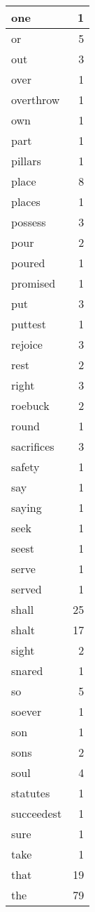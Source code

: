 \begin{center}
\begin{longtable}{l|r}
one & 1 \\ \hline
or & 5 \\ \hline
out & 3 \\ \hline
over & 1 \\ \hline
overthrow & 1 \\ \hline
own & 1 \\ \hline
part & 1 \\ \hline
pillars & 1 \\ \hline
place & 8 \\ \hline
places & 1 \\ \hline
possess & 3 \\ \hline
pour & 2 \\ \hline
poured & 1 \\ \hline
promised & 1 \\ \hline
put & 3 \\ \hline
puttest & 1 \\ \hline
rejoice & 3 \\ \hline
rest & 2 \\ \hline
right & 3 \\ \hline
roebuck & 2 \\ \hline
round & 1 \\ \hline
sacrifices & 3 \\ \hline
safety & 1 \\ \hline
say & 1 \\ \hline
saying & 1 \\ \hline
seek & 1 \\ \hline
seest & 1 \\ \hline
serve & 1 \\ \hline
served & 1 \\ \hline
shall & 25 \\ \hline
shalt & 17 \\ \hline
sight & 2 \\ \hline
snared & 1 \\ \hline
so & 5 \\ \hline
soever & 1 \\ \hline
son & 1 \\ \hline
sons & 2 \\ \hline
soul & 4 \\ \hline
statutes & 1 \\ \hline
succeedest & 1 \\ \hline
sure & 1 \\ \hline
take & 1 \\ \hline
that & 19 \\ \hline
the & 79 \\ \hline

\end{longtable}
\end{center}

